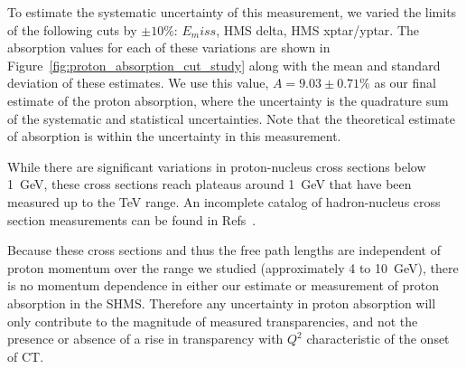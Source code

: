 To estimate the systematic uncertainty of this measurement, we varied the limits
of the following cuts by $\pm10\%$: $E_miss$, HMS delta, HMS xptar/yptar.
The absorption values for each of these variations are shown in
Figure~\ref{fig:proton_absorption_cut_study} along with the mean and standard
deviation of these estimates.
We use this value, $A=9.03\pm0.71\%$ as our final estimate of the proton
absorption, where the uncertainty is the quadrature sum of the systematic and
statistical uncertainties.
Note that the theoretical estimate of absorption is within the uncertainty in
this measurement.


While there are significant variations in proton-nucleus cross sections below
\SI{1}{\giga\electronvolt},
these cross sections reach plateaus around \SI{1}{\giga\electronvolt}
that have been measured up to the \si{\tera\electronvolt} range.
An incomplete catalog of hadron-nucleus cross section measurements can be found
in Refs~\cite{Carroll_1979, Kwong_1984, Denisov_1973, Ray_1979, Wellisch_1996,
Letaw_1983, Kohama_2016}.


Because these cross sections and thus the free path lengths are independent of
proton momentum over the range we studied (approximately 4 to
\SI{10}{\giga\electronvolt}), there is no momentum dependence in either our
estimate or measurement of proton absorption in the SHMS.
Therefore any uncertainty in proton absorption will only contribute to the
magnitude of measured transparencies, and not the presence or absence of a rise
in transparency with $Q^2$ characteristic of the onset of CT.

